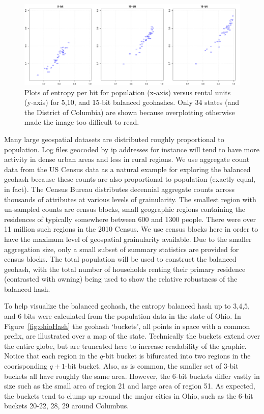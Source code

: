 \documentclass[nips13submit_09,times,art10]{article} %
\begin{document}
\begin{figure}
\centering
\includegraphics[width=6in]{fig04}
\caption{Plots of entropy per bit for population (x-axis) versus rental units (y-axis)
for 5,10, and 15-bit balanced geohashes. Only 34 states (and the District of Columbia)
are shown because overplotting otherwise made the image too difficult to read.}
 \label{fig:allStatesEntropy}
\end{figure}

Many large geospatial datasets are distributed roughly proportional to population. Log files
geocoded by ip addresses for instance will tend to have more activity in dense urban areas
and less in rural regions. We use aggregate count data from the US Census data as a natural
example for exploring the balanced geohash because these counts are also proportional to
population (exactly equal, in fact). The Census Bureau distributes decennial aggregate
counts across thousands of attributes at various levels of grainularity. The smallest region
with un-sampled counts are
census blocks, small geographic regions containing the residences of typically somewhere
between 600 and 1300 people. There were over 11 million such regions in the 2010 Census. We
use census blocks here in order to have the maximum level of geospatial grainularity available.
Due to the smaller aggregation size, only a small subset of summary statistics are provided
for census blocks. The total population will be used to construct the balanced geohash, with
the total number of households renting their primary residence (contrasted with owning) being
used to show the relative robustness of the balanced hash.

To help visualize the balanced geohash, the entropy balanced hash up to $3$,$4$,$5$, and
$6$-bits were calculated from the population data in the state of Ohio. In Figure~\ref{fig:ohioHash}
the geohash `buckets', all points in space with a common prefix, are illustrated over a
map of the state. Technically the buckets extend over the entire globe, but are truncated here
to increase readability of the graphic. Notice that each region in the $q$-bit bucket is bifurcated
into two regions in the coorisponding $q+1$-bit bucket. Also, as is common, the smaller set of
$3$-bit buckets all have roughly the same area. However, the $6$-bit buckets differ vastly in size
such as the small area of region 21 and large area of region 51. As expected, the buckets
tend to clump up around the major cities in Ohio, such as the $6$-bit buckets 20-22, 28, 29
around Columbus.
\end{document}
